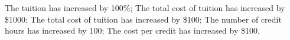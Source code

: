 \documentclass[11pt,answers]{exam}
\begin{document}
\begin{questions}
\begin{oneparchoices}
		\choice The tuition has increased by 100\%;
		\choice The total cost of tuition has increased by \$1000;
		\choice The total cost of tuition has increased by \$100;
	\choice The number of credit hours has increased by 100;
	\choice The cost per credit has increased by \$100.

\end{oneparchoices}
\end{questions}
\end{document}
